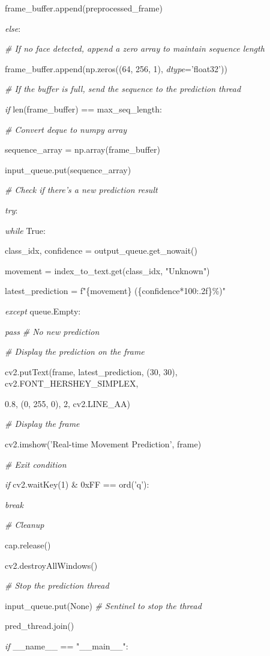 \documentclass[
]{article}
\begin{document}
frame\_buffer.append(preprocessed\_frame)

\emph{else}:

\emph{\# If no face detected, append a zero array to maintain sequence length}

frame\_buffer.append(np.zeros((64, 256, 1), \emph{dtype}='float32'))

\emph{\# If the buffer is full, send the sequence to the prediction thread}

\emph{if} len(frame\_buffer) == max\_seq\_length:

\emph{\# Convert deque to numpy array}

sequence\_array = np.array(frame\_buffer)

input\_queue.put(sequence\_array)

\emph{\# Check if there's a new prediction result}

\emph{try}:

\emph{while} True:

class\_idx, confidence = output\_queue.get\_nowait()

movement = index\_to\_text.get(class\_idx, "Unknown")

latest\_prediction = f"\{movement\} (\{confidence*100:.2f\}\%)"

\emph{except} queue.Empty:

\emph{pass} \emph{\# No new prediction}

\emph{\# Display the prediction on the frame}

cv2.putText(frame, latest\_prediction, (30, 30), cv2.FONT\_HERSHEY\_SIMPLEX,

0.8, (0, 255, 0), 2, cv2.LINE\_AA)

\emph{\# Display the frame}

cv2.imshow('Real-time Movement Prediction', frame)

\emph{\# Exit condition}

\emph{if} cv2.waitKey(1) \& 0xFF == ord('q'):

\emph{break}

\emph{\# Cleanup}

cap.release()

cv2.destroyAllWindows()

\emph{\# Stop the prediction thread}

input\_queue.put(None) \emph{\# Sentinel to stop the thread}

pred\_thread.join()

\emph{if} \_\_name\_\_ == "\_\_main\_\_":
\end{document}
